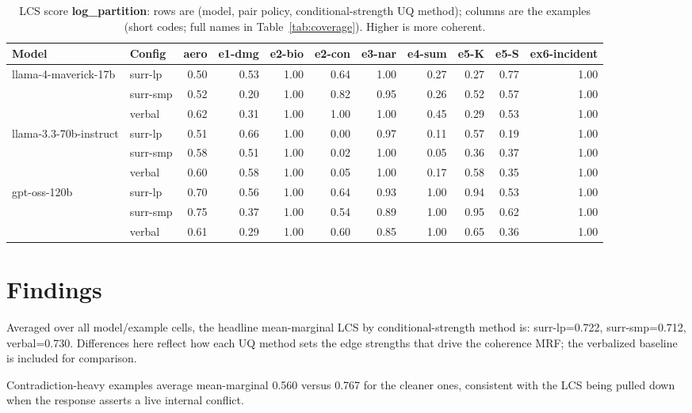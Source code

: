 \documentclass[11pt]{article}
\begin{document}
\begin{table}[htbp]
\centering
\footnotesize
\setlength{\tabcolsep}{3.5pt}
\caption{LCS score \textbf{log\_partition}: rows are (model, pair policy, conditional-strength UQ method); columns are the examples (short codes; full names in Table~\ref{tab:coverage}). Higher is more coherent.}
\label{tab:log-partition}
\begin{tabular}{llrrrrrrrrr}
\toprule
\textbf{Model} & \textbf{Config} & \textbf{aero} & \textbf{e1-dmg} & \textbf{e2-bio} & \textbf{e2-con} & \textbf{e3-nar} & \textbf{e4-sum} & \textbf{e5-K} & \textbf{e5-S} & \textbf{ex6-incident} \\
\midrule
llama-4-maverick-17b & surr-lp & 0.50 & 0.53 & 1.00 & 0.64 & 1.00 & 0.27 & 0.27 & 0.77 & 1.00 \\
 & surr-smp & 0.52 & 0.20 & 1.00 & 0.82 & 0.95 & 0.26 & 0.52 & 0.57 & 1.00 \\
 & verbal & 0.62 & 0.31 & 1.00 & 1.00 & 1.00 & 0.45 & 0.29 & 0.53 & 1.00 \\
\midrule
llama-3.3-70b-instruct & surr-lp & 0.51 & 0.66 & 1.00 & 0.00 & 0.97 & 0.11 & 0.57 & 0.19 & 1.00 \\
 & surr-smp & 0.58 & 0.51 & 1.00 & 0.02 & 1.00 & 0.05 & 0.36 & 0.37 & 1.00 \\
 & verbal & 0.60 & 0.58 & 1.00 & 0.05 & 1.00 & 0.17 & 0.58 & 0.35 & 1.00 \\
\midrule
gpt-oss-120b & surr-lp & 0.70 & 0.56 & 1.00 & 0.64 & 0.93 & 1.00 & 0.94 & 0.53 & 1.00 \\
 & surr-smp & 0.75 & 0.37 & 1.00 & 0.54 & 0.89 & 1.00 & 0.95 & 0.62 & 1.00 \\
 & verbal & 0.61 & 0.29 & 1.00 & 0.60 & 0.85 & 1.00 & 0.65 & 0.36 & 1.00 \\
\bottomrule
\end{tabular}
\end{table}


\section{Findings}

Averaged over all model/example cells, the headline mean-marginal LCS by conditional-strength method is: surr-lp=0.722, surr-smp=0.712, verbal=0.730. Differences here reflect how each UQ method sets the edge strengths that drive the coherence MRF; the verbalized baseline is included for comparison.

Contradiction-heavy examples average mean-marginal 0.560 versus 0.767 for the cleaner ones, consistent with the LCS being pulled down when the response asserts a live internal conflict.
\end{document}
